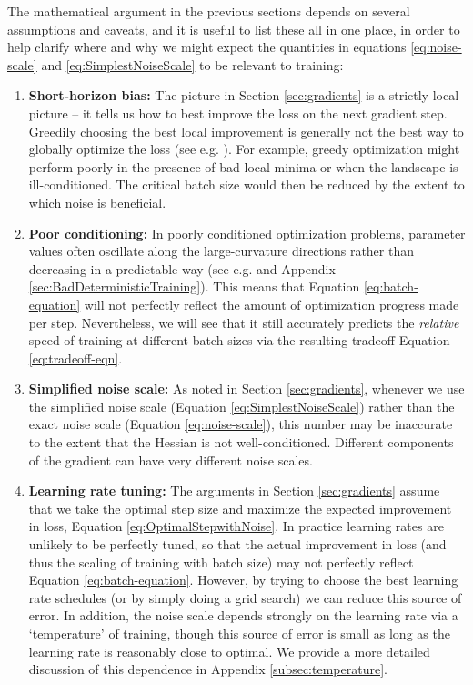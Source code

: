 \documentclass[english]{article}
\begin{document}
The mathematical argument in the previous sections depends on several assumptions and caveats, and it is useful to list these all in one place, in order to help clarify where and why we might expect the quantities in equations \ref{eq:noise-scale} and \ref{eq:SimplestNoiseScale} to be relevant to training:
\begin{enumerate}
\item \textbf{Short-horizon bias:} The picture in Section \ref{sec:gradients} is a strictly local picture -- it tells us how to best improve the loss on the next gradient step. Greedily choosing the best local improvement is generally not the best way to globally optimize the loss (see e.g. \cite{1803.02021}). For example, greedy optimization might perform poorly in the presence of bad local minima or when the landscape is ill-conditioned.  The critical batch size would then be reduced by the extent to which noise is beneficial.
\item \textbf{Poor conditioning:} In poorly conditioned optimization problems, parameter values often oscillate along the large-curvature directions rather than decreasing in a predictable way (see e.g. \cite{goh2017why} and Appendix \ref{sec:BadDeterministicTraining}).  This means that Equation \ref{eq:batch-equation} will not perfectly reflect the amount of optimization progress made per step.  Nevertheless, we will see that it still accurately predicts the \emph{relative} speed of training at different batch sizes via the resulting tradeoff Equation \ref{eq:tradeoff-eqn}.
\item \textbf{Simplified noise scale:} As noted in Section \ref{sec:gradients}, whenever we use the simplified noise scale (Equation \ref{eq:SimplestNoiseScale}) rather than the exact noise scale (Equation \ref{eq:noise-scale}), this number may be inaccurate to the extent that the Hessian is not well-conditioned. Different components of the gradient can have very different noise scales.
\item \textbf{Learning rate tuning:} The arguments in Section \ref{sec:gradients} assume that we take the optimal step size and maximize the expected improvement in loss, Equation \ref{eq:OptimalStepwithNoise}. In practice learning rates are unlikely to be perfectly tuned, so that the actual improvement in loss (and thus the scaling of training with batch size) may not perfectly reflect Equation \ref{eq:batch-equation}.  However, by trying to choose the best learning rate schedules (or by simply doing a grid search) we can reduce this source of error.  In addition, the noise scale depends strongly on the learning rate via a `temperature' of training, though this source of error is small as long as the learning rate is reasonably close to optimal.  We provide a more detailed discussion of this dependence in Appendix \ref{subsec:temperature}.

\end{enumerate}
\end{document}

